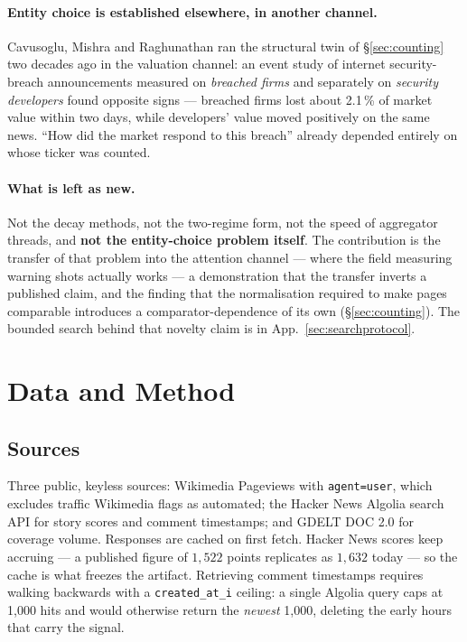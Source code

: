 \documentclass[11pt,a4paper]{article}
\begin{document}
\paragraph{Entity choice is established elsewhere, in another channel.}
Cavusoglu, Mishra and Raghunathan \cite{cavusoglu2004breach} ran the structural
twin of §\ref{sec:counting} two decades ago in the valuation channel: an event
study of internet security-breach announcements measured on \emph{breached
firms} and separately on \emph{security developers} found opposite signs ---
breached firms lost about 2.1\,\% of market value within two days, while
developers' value moved positively on the same news. ``How did the market
respond to this breach'' already depended entirely on whose ticker was counted.

\paragraph{What is left as new.} Not the decay methods, not the two-regime form,
not the speed of aggregator threads, and \textbf{not the entity-choice problem
itself}. The contribution is the transfer of that problem into the attention
channel --- where the field measuring warning shots actually works --- a
demonstration that the transfer inverts a published claim, and the finding that
the normalisation required to make pages comparable introduces a
comparator-dependence of its own (§\ref{sec:counting}). The bounded search
behind that novelty claim is in App.~\ref{sec:searchprotocol}.

\section{Data and Method}

\subsection{Sources}

Three public, keyless sources: Wikimedia Pageviews \cite{wikimedia2026pageviews}
with \texttt{agent=user}, which excludes traffic Wikimedia flags as automated;
the Hacker News Algolia search API for story scores and comment timestamps; and
GDELT DOC 2.0 \cite{gdelt2026doc} for coverage volume. Responses are cached on
first fetch. Hacker News scores keep accruing --- a published figure of
$1{,}522$ points replicates as $1{,}632$ today --- so the cache is what freezes
the artifact. Retrieving comment timestamps requires walking backwards with a
\texttt{created\_at\_i} ceiling: a single Algolia query caps at 1{,}000 hits and
would otherwise return the \emph{newest} 1{,}000, deleting the early hours that
carry the signal.
\end{document}
